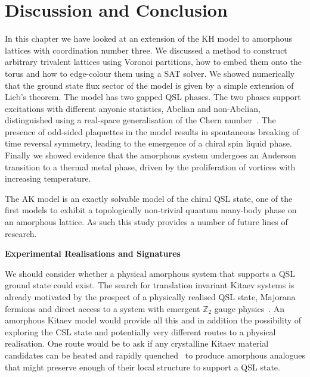 \hypertarget{sec:AMK-Conclusion}{%
\section{Discussion and Conclusion}\label{sec:AMK-Conclusion}}

In this chapter we have looked at an extension of the KH model to amorphous lattices with coordination number three. We discussed a method to construct arbitrary trivalent lattices using Voronoi partitions, how to embed them onto the torus and how to edge-colour them using a SAT solver. We showed numerically that the ground state flux sector of the model is given by a simple extension of Lieb's theorem. The model has two gapped QSL phases. The two phases support excitations with different anyonic statistics, Abelian and non-Abelian, distinguished using a real-space generalisation of the Chern number~\autocite{peru_preprint}. The presence of odd-sided plaquettes in the model results in spontaneous breaking of time reversal symmetry, leading to the emergence of a chiral spin liquid phase. Finally we showed evidence that the amorphous system undergoes an Anderson transition to a thermal metal phase, driven by the proliferation of vortices with increasing temperature.

The AK model is an exactly solvable model of the chiral QSL state, one of the first models to exhibit a topologically non-trivial quantum many-body phase on an amorphous lattice. As such this study provides a number of future lines of research.

\textbf{Experimental Realisations and Signatures}

We should consider whether a physical amorphous system that supports a QSL ground state could exist. The search for translation invariant Kitaev systems is already motivated by the prospect of a physically realised QSL state, Majorana fermions and direct access to a system with emergent \(\mathbb{Z}_2\) gauge physics~\autocite{TrebstPhysRep2022}. An amorphous Kitaev model would provide all this and in addition the possibility of exploring the CSL state and potentially very different routes to a physical realisation. One route would be to ask if any crystalline Kitaev material candidates can be heated and rapidly quenched~\autocite{Weaire1976,Petrakovski1981,Kaneyoshi2018} to produce amorphous analogues that might preserve enough of their local structure to support a QSL state.

